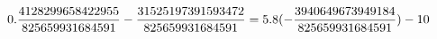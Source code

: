 \documentclass[preview]{standalone}
\begin{document}
\begin{align*}
\special{dvisvgm:raw <g id='unique000'>}0.\frac{4128299658422955}{825659931684591} - \frac{31525197391593472}{825659931684591} = 5.8 (- \frac{3940649673949184}{825659931684591}) - 10\special{dvisvgm:raw </g>}
\end{align*}
\end{document}
